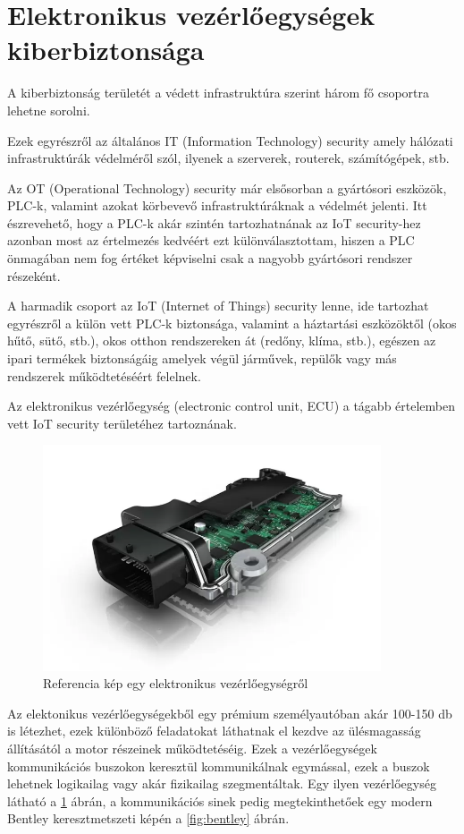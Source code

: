 \section{Elektronikus vezérlőegységek kiberbiztonsága}

A kiberbiztonság területét a védett infrastruktúra szerint három fő csoportra lehetne sorolni. 

Ezek egyrészről az általános IT (Information Technology) security amely hálózati infrastruktúrák védelméről szól, ilyenek a szerverek, routerek, számítógépek, stb. 

Az OT (Operational Technology) security már elsősorban a gyártósori eszközök, PLC-k, valamint azokat körbevevő infrastruktúráknak a védelmét jelenti. Itt észrevehető, hogy a PLC-k akár szintén tartozhatnának az IoT security-hez azonban most az értelmezés kedvéért ezt különválasztottam, hiszen a PLC önmagában nem fog értéket képviselni csak a nagyobb gyártósori rendszer részeként. 

A harmadik csoport az IoT (Internet of Things) security lenne, ide tartozhat egyrészről a külön vett PLC-k biztonsága, valamint a háztartási eszközöktől (okos hűtő, sütő, stb.), okos otthon rendszereken át (redőny, klíma, stb.), egészen az ipari termékek biztonságáig amelyek végül járművek, repülők vagy más rendszerek működtetéséért felelnek.

Az elektronikus vezérlőegység (electronic control unit, ECU) a tágabb értelemben vett IoT security területéhez tartoznának. \\

\begin{figure}[!ht]
	\centering
	\includegraphics[width=100mm, keepaspectratio]{figures/ecu.png}
	\caption{Referencia kép egy elektronikus vezérlőegységről\cite{ecu}}
	\label{fig:ecu}
\end{figure}

Az elektonikus vezérlőegységekből egy prémium személyautóban akár 100-150 db is létezhet, ezek különböző feladatokat láthatnak el kezdve az ülésmagasság állításától a motor részeinek működtetéséig. Ezek a vezérlőegységek kommunikációs buszokon keresztül kommunikálnak egymással, ezek a buszok lehetnek logikailag vagy akár fizikailag szegmentáltak. Egy ilyen vezérlőegység látható a \ref{fig:ecu} ábrán, a kommunikációs sinek pedig megtekinthetőek egy modern Bentley keresztmetszeti képén a \ref{fig:bentley} ábrán.\\

